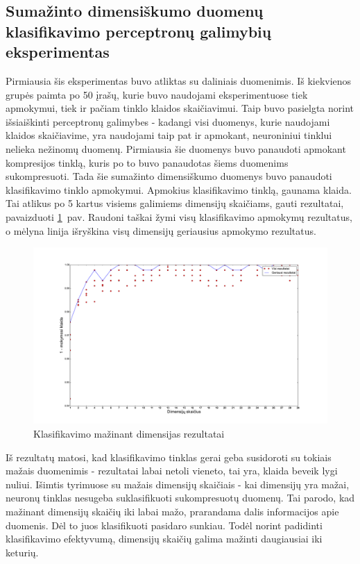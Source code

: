 \documentclass{VUMIFPSbakalaurinis}
\begin{document}
\subsection{Sumažinto dimensiškumo duomenų klasifikavimo perceptronų galimybių eksperimentas}

Pirmiausia šis eksperimentas buvo atliktas su daliniais duomenimis.
Iš kiekvienos grupės paimta po 50 įrašų, kurie buvo naudojami eksperimentuose tiek apmokymui, tiek ir pačiam tinklo klaidos skaičiavimui.
Taip buvo pasielgta norint išsiaiškinti perceptronų galimybes - kadangi visi duomenys, kurie naudojami klaidos skaičiavime, yra naudojami taip pat ir apmokant, neuroniniui tinklui nelieka nežinomų duomenų.
Pirmiausia šie duomenys buvo panaudoti apmokant kompresijos tinklą, kuris po to buvo panaudotas šiems duomenims sukompresuoti.
Tada šie sumažinto dimensiškumo duomenys buvo panaudoti klasifikavimo tinklo apmokymui.
Apmokius klasifikavimo tinklą, gaunama klaida.
Tai atlikus po 5 kartus visiems galimiems dimensijų skaičiams, gauti rezultatai, pavaizduoti \ref{fig:experiment-1}~pav.
Raudoni taškai žymi visų klasifikavimo apmokymų rezultatus, o mėlyna linija išryškina visų dimensijų geriausius apmokymo rezultatus.

\begin{figure}[h]
	\centering
	\centerline{\includegraphics[scale=0.37]{pics/dimensions_2015-5-23_15-50-6}}
	\caption{Klasifikavimo mažinant dimensijas rezultatai}
	\label{fig:experiment-1}
\end{figure}

Iš rezultatų matosi, kad klasifikavimo tinklas gerai geba susidoroti su tokiais mažais duomenimis - rezultatai labai netoli vieneto, tai yra, klaida beveik lygi nuliui.
Išimtis tyrimuose su mažais dimensijų skaičiais - kai dimensijų yra mažai, neuronų tinklas nesugeba suklasifikuoti sukompresuotų duomenų.
Tai parodo, kad mažinant dimensijų skaičių iki labai mažo, prarandama dalis informacijos apie duomenis.
Dėl to juos klasifikuoti pasidaro sunkiau.
Todėl norint padidinti klasifikavimo efektyvumą, dimensijų skaičių galima mažinti daugiausiai iki keturių.
\end{document}
